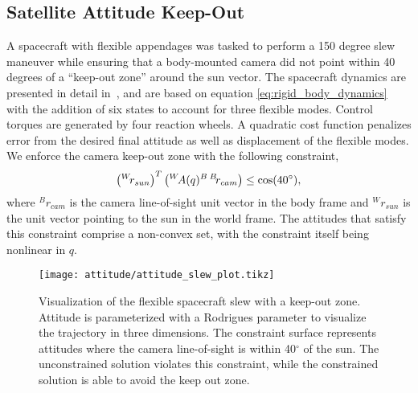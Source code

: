 \documentclass[../root.tex]{subfiles}
\begin{document}
    \subsection{Satellite Attitude Keep-Out}
        A spacecraft with flexible appendages was tasked to perform a 150
        degree slew maneuver while ensuring that a body-mounted camera did
        not point within 40 degrees of a ``keep-out zone'' around the sun
        vector. The spacecraft dynamics are presented in detail
        in~\cite{tracy_ModelPredictive_2020}, and are based on equation
        \eqref{eq:rigid_body_dynamics} with the addition of six states to
        account for three flexible modes. Control torques are generated by
        four reaction wheels. A quadratic cost function penalizes error from
        the desired final attitude as well as displacement of the flexible
        modes.
        We enforce the camera keep-out zone with the following constraint,
        \begin{equation}
            \left(\inframe{W}{r_{sun}}\right)^T 
            \left(\toframe{W}{B}{A(q)} \, \inframe{B}{r_{cam}} \right) \leq \cos(40 ^\circ) ,
        \end{equation}
        where $^Br_{cam}$ is the camera line-of-sight unit vector in the body
        frame and $^Wr_{sun}$ is the unit vector pointing to the sun in the
        world frame. The attitudes that satisfy this constraint comprise a
        non-convex set, with the constraint itself being nonlinear in $q$.
        \begin{figure}[ht]
            \centering
            \texttt{[image: attitude/attitude\_slew\_plot.tikz]}
            \caption{Visualization of the flexible spacecraft slew with a
            keep-out zone. Attitude is parameterized with a Rodrigues
            parameter to visualize the trajectory in three dimensions. The
            constraint surface represents attitudes where the camera
            line-of-sight is within 40$^\circ$ of the sun. The unconstrained
            solution violates this constraint, while the constrained solution
            is able to avoid the keep out zone.}
            \label{fig:keepout}
        \end{figure}
        
\end{document}
